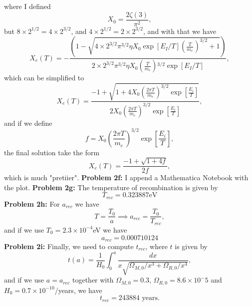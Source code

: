\documentclass[11pt]{article}
\begin{document}
where I defined 
\begin{displaymath}
  X_0 = \frac{2\zeta(3)}{\pi^2},
\end{displaymath}
but $8\times2^{1/2}=4\times2^{3/2}$, and $4\times 2^{1/2} = 2\times 2^{3/2}$, and with that we have
\begin{displaymath}
  X_e(T)  = -\frac{ \left(1 -\sqrt{4\times2^{3/2} \pi^{3/2} \eta  X_0 \exp[E_I/T] 
   \left(\frac{T}{m_e}^{}\right)^{3/2}+1}\right)}{2\times 2^{3/2} \pi
   ^{3/2} \eta  X_0 \left(\frac{T}{m_e}\right){}^{3/2}\exp[E_I/T]},
\end{displaymath}
which can be simplified to
\begin{displaymath}
  X_e(T) = \frac{-1+\sqrt{1 + 4 X_0\left(\frac{2\pi T}{m_e}\right)^{3/2} \exp\left[\frac{E_i}{T}\right]}}{2X_0\left(\frac{2\pi T}{m_e}\right)^{3/2} \exp\left[\frac{E_i}{T}\right]},
\end{displaymath}
and if we define 
\begin{displaymath}
  f = X_0\left(\frac{2\pi T}{m_e}\right)^{3/2} \exp\left[\frac{E_i}{T}\right],
\end{displaymath}
the final solution take the form
\begin{displaymath}
  X_e(T) = \frac{-1 + \sqrt{1+4f}}{2f},
\end{displaymath}
which is much "pretiier".
\newline
\textbf{Problem 2f:} I append a Mathematica Notebook with the plot.
\newline
\textbf{Problem 2g:} The temperature of recombination is given by
\begin{displaymath}
  T_{rec}=0.323887 \text{eV}
\end{displaymath}
\newline
\textbf{Problem 2h:} For $a_{rec}$ we have
\begin{displaymath}
  T=\frac{T_0}{a}\implies a_{rec} = \frac{T_0}{T_{rec}},
\end{displaymath}
and if we use $T_0 = 2.3\times 10^{-4}$eV we have
\begin{displaymath}
  a_{rec} = 0.000710124
\end{displaymath}
\newline
\textbf{Problem 2i:} Finally, we need to compute $t_{rec}$, where $t$ is given by
\begin{displaymath}
  t(a) = \frac{1}{H_0}\int_{0}^{a} \frac{dx}{x\sqrt{\Omega_{M,0}/x^3 + \Omega_{R,0}/x^4}},
\end{displaymath}
and if we use $a = a_{rec}$ together with $\Omega_{M,0} = 0.3$, $\Omega_{R,0}=8.6\times 10^-5$ and $H_0=0.7\times 10^{-10}$/years, we have
\begin{displaymath}
  t_{rec} = 243884 \text{ years}.
\end{displaymath}
\end{document}
